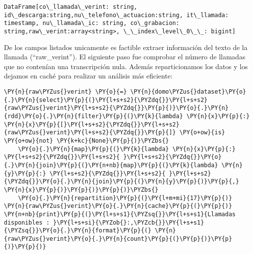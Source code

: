  \begin{tcolorbox}[breakable, size=fbox, boxrule=.5pt, pad at break*=1mm, opacityfill=0]
\begin{Verbatim}[commandchars=\\\{\}]
DataFrame[co\_llamada\_verint: string, id\_descarga:string,nu\_telefono\_actuacion:string, it\_llamada: timestamp, nu\_llamada\_ic: string, co\_grabacion: string,raw\_verint:array<string>, \_\_index\_level\_0\_\_: bigint]
\end{Verbatim}
\end{tcolorbox}


De los campos listados unicamente es factible extraer información del texto de la llamada (``raw\_verint''). El siguiente paso fue comprobar el número de llamadas que no contenían una transcripción nula. Además reparticionamos los datos y los dejamos en caché para realizar un análisis más eficiente: 

\vspace{0.5cm}


    \begin{tcolorbox}[breakable, size=fbox, boxrule=1pt, pad at break*=1mm,colback=cellbackground, colframe=cellborder]
\begin{Verbatim}[commandchars=\\\{\}]
\PY{n}{raw\PYZus{}verint} \PY{o}{=} \PY{n}{domo\PYZus{}dataset}\PY{o}{.}\PY{n}{select}\PY{p}{(}\PY{l+s+s2}{\PYZdq{}}\PY{l+s+s2}{raw\PYZus{}verint}\PY{l+s+s2}{\PYZdq{}}\PY{p}{)}\PY{o}{.}\PY{n}{rdd}\PY{o}{.}\PY{n}{filter}\PY{p}{(}\PY{k}{lambda} \PY{n}{x}\PY{p}{:} \PY{n}{x}\PY{p}{[}\PY{l+s+s2}{\PYZdq{}}\PY{l+s+s2}{raw\PYZus{}verint}\PY{l+s+s2}{\PYZdq{}}\PY{p}{]} \PY{o+ow}{is} \PY{o+ow}{not} \PY{k+kc}{None}\PY{p}{)}\PYZbs{}
    \PY{o}{.}\PY{n}{map}\PY{p}{(}\PY{k}{lambda} \PY{n}{x}\PY{p}{:} \PY{l+s+s2}{\PYZdq{}}\PY{l+s+s2}{ }\PY{l+s+s2}{\PYZdq{}}\PY{o}{.}\PY{n}{join}\PY{p}{(}\PY{n+nb}{map}\PY{p}{(}\PY{k}{lambda} \PY{n}{y}\PY{p}{:} \PY{l+s+s2}{\PYZdq{}}\PY{l+s+s2}{ }\PY{l+s+s2}{\PYZdq{}}\PY{o}{.}\PY{n}{join}\PY{p}{(}\PY{n}{y}\PY{p}{)}\PY{p}{,} \PY{n}{x}\PY{p}{)}\PY{p}{)}\PY{p}{)}\PYZbs{}
    \PY{o}{.}\PY{n}{repartition}\PY{p}{(}\PY{l+m+mi}{17}\PY{p}{)}
\PY{n}{raw\PYZus{}verint}\PY{o}{.}\PY{n}{cache}\PY{p}{(}\PY{p}{)}
\PY{n+nb}{print}\PY{p}{(}\PY{l+s+s1}{\PYZsq{}}\PY{l+s+s1}{Llamadas disponibles : }\PY{l+s+si}{\PYZob{}:,\PYZcb{}}\PY{l+s+s1}{\PYZsq{}}\PY{o}{.}\PY{n}{format}\PY{p}{(} \PY{n}{raw\PYZus{}verint}\PY{o}{.}\PY{n}{count}\PY{p}{(}\PY{p}{)}\PY{p}{)}\PY{p}{)}  
\end{Verbatim}
\end{tcolorbox}

